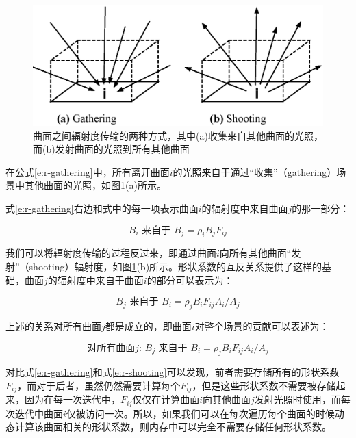 \begin{figure}
\sidecaption
	\includegraphics[width=.65\textwidth]{figures/r/shooting}
	\caption{曲面之间辐射度传输的两种方式，其中(a)收集来自其他曲面的光照，而(b)发射曲面的光照到所有其他曲面}	
	\label{f:r-gathering-and-shooting}
\end{figure}

在公式\ref{e:r-gathering}中，所有离开曲面$i$的光照来自于通过“收集”（gathering）场景中其他曲面的光照，如图\ref{f:r-gathering-and-shooting}(a)所示。

式\ref{e:r-gathering}右边和式中的每一项表示曲面$i$的辐射度中来自曲面$j$的那一部分：

\begin{equation}
	B_i \text{ 来自于 }B_j=\rho_i B_j F_{ij}
\end{equation}

\noindent 我们可以将辐射度传输的过程反过来，即通过曲面$i$向所有其他曲面“发射”（shooting）辐射度，如图\ref{f:r-gathering-and-shooting}(b)所示。形状系数的互反关系提供了这样的基础，曲面$j$的辐射度中来自于曲面$i$的部分可以表示为：

\begin{equation}\label{e:r-shooting}
	B_j\text{ 来自于 }B_i=\rho_j B_iF_{ij}A_i/A_j
\end{equation}

\noindent 上述的关系对所有曲面$j$都是成立的，即曲面$i$对整个场景的贡献可以表述为：

\begin{equation}\label{e:r-shooting}
	\text{对所有曲面$j$: } B_j\text{ 来自于 }B_i=\rho_j B_iF_{ij}A_i/A_j
\end{equation}

\noindent 对比式\ref{e:r-gathering}和式\ref{e:r-shooting}可以发现，前者需要存储所有的形状系数$F_{ij}$，而对于后者，虽然仍然需要计算每个$F_{ij}$，但是这些形状系数不需要被存储起来，因为在每一次迭代中，$F_{ij}$仅仅在计算曲面$i$向其他曲面$j$发射光照时使用，而每次迭代中曲面$i$仅被访问一次。所以，如果我们可以在每次遍历每个曲面的时候动态计算该曲面相关的形状系数，则内存中可以完全不需要存储任何形状系数。

